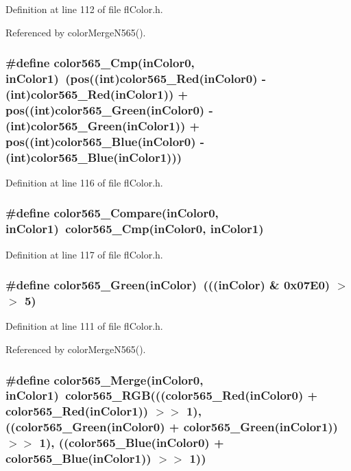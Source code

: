 Definition at line 112 of file fl\-Color.h.

Referenced by color\-Merge\-N565().
\subsubsection{\setlength{\rightskip}{0pt plus 5cm}\#define color565\_\-Cmp(in\-Color0, in\-Color1)~(pos((int)color565\_\-Red(in\-Color0) - (int)color565\_\-Red(in\-Color1)) + pos((int)color565\_\-Green(in\-Color0) - (int)color565\_\-Green(in\-Color1)) + pos((int)color565\_\-Blue(in\-Color0) - (int)color565\_\-Blue(in\-Color1)))}\label{flColor_8h_24bf7e5e9050dd27e8ce637017b31750}




Definition at line 116 of file fl\-Color.h.
\subsubsection{\setlength{\rightskip}{0pt plus 5cm}\#define color565\_\-Compare(in\-Color0, in\-Color1)~color565\_\-Cmp(in\-Color0, in\-Color1)}\label{flColor_8h_5710d2ad6345d9a2b2cd6de274c82482}




Definition at line 117 of file fl\-Color.h.
\subsubsection{\setlength{\rightskip}{0pt plus 5cm}\#define color565\_\-Green(in\-Color)~(((in\-Color) \& 0x07E0) $>$$>$ 5)}\label{flColor_8h_a7f6ab20e4338874c3ddce320eaf3fe5}




Definition at line 111 of file fl\-Color.h.

Referenced by color\-Merge\-N565().
\subsubsection{\setlength{\rightskip}{0pt plus 5cm}\#define color565\_\-Merge(in\-Color0, in\-Color1)~color565\_\-RGB(((color565\_\-Red(in\-Color0) + color565\_\-Red(in\-Color1)) $>$$>$ 1), ((color565\_\-Green(in\-Color0) + color565\_\-Green(in\-Color1)) $>$$>$ 1), ((color565\_\-Blue(in\-Color0) + color565\_\-Blue(in\-Color1)) $>$$>$ 1))}\label{flColor_8h_767d1f5dae3d49a16b823a502fb00d07}




